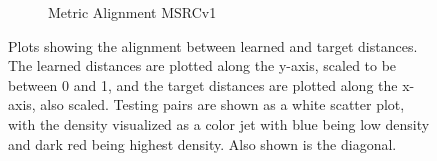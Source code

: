\begin{figure}[p]
\begin{subfigure}{.5\textwidth}
  \caption{Metric Alignment MSRCv1}
  \label{fig:sub6}
\end{subfigure}
\caption{Plots showing the alignment between learned and target distances. The learned distances are plotted along the y-axis, scaled to be between 0 and 1, and the target distances are plotted along the x-axis, also scaled. Testing pairs are shown as a white scatter plot, with the density visualized as a color jet with blue being low density and dark red being highest density. Also shown is the diagonal.}
\label{fig:alignment}
\end{figure}






























